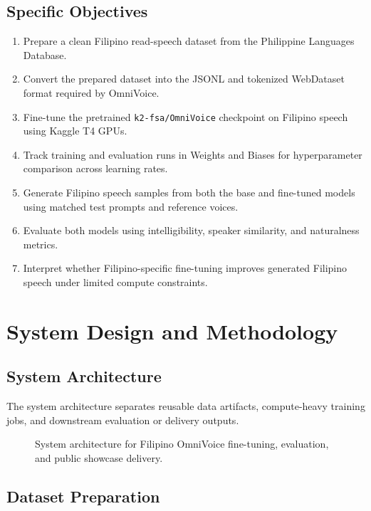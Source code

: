 \documentclass[11pt]{article}
\begin{document}
\subsection{Specific Objectives}

\begin{enumerate}
  \item Prepare a clean Filipino read-speech dataset from the Philippine Languages Database.
  \item Convert the prepared dataset into the JSONL and tokenized WebDataset format required by OmniVoice.
  \item Fine-tune the pretrained \texttt{k2-fsa/OmniVoice} checkpoint on Filipino speech using Kaggle T4 GPUs.
  \item Track training and evaluation runs in Weights and Biases for hyperparameter comparison across learning rates.
  \item Generate Filipino speech samples from both the base and fine-tuned models using matched test prompts and reference voices.
  \item Evaluate both models using intelligibility, speaker similarity, and naturalness metrics.
  \item Interpret whether Filipino-specific fine-tuning improves generated Filipino speech under limited compute constraints.
\end{enumerate}

\section{System Design and Methodology}

\subsection{System Architecture}

The system architecture separates reusable data artifacts, compute-heavy training jobs, and downstream evaluation or delivery outputs.

\begin{figure}[H]
  \centering
  \small
  \makebox[\linewidth][c]{\resizebox{1.18\linewidth}{!}{}}
  \caption{System architecture for Filipino OmniVoice fine-tuning, evaluation, and public showcase delivery.}
  \label{fig:architecture}
\end{figure}

\subsection{Dataset Preparation}
\end{document}
